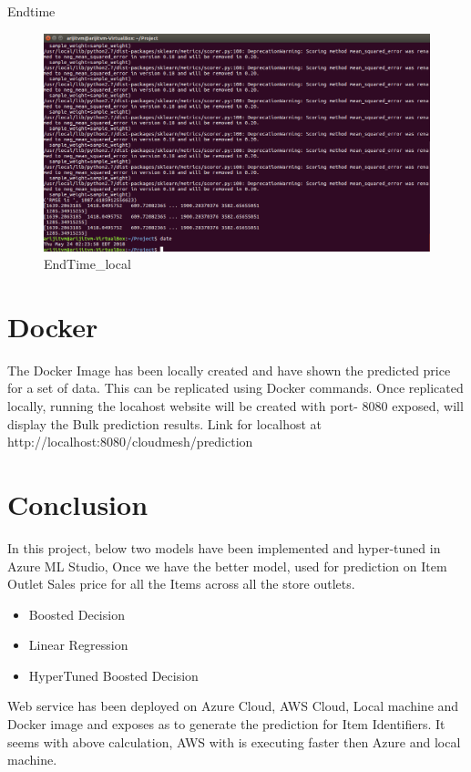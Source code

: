 Endtime 
\begin{figure}[pic12]
	\centering\includegraphics[width=\columnwidth]
{Images/EndTime_local.png}
	\caption{EndTime_local}\label{fig:EndTime_local}
\end{figure}

\section{Docker}

The Docker Image has been locally created and have shown the predicted 
price for a set of data. This can be replicated using Docker commands. 
Once replicated locally, running the locahost website will be created 
with port- 8080 exposed, will display the Bulk prediction results.
Link for localhost at http://localhost:8080/cloudmesh/prediction

\section{Conclusion}

In this project, below two models have been implemented and 
hyper-tuned in Azure ML Studio, Once we have the better model, used for 
prediction on Item Outlet Sales price for all the Items 
across all the store outlets.
\begin{itemize}
\item Boosted Decision
\item Linear Regression
\item HyperTuned Boosted Decision
\end{itemize}
Web service has been deployed on Azure Cloud, AWS Cloud, Local machine 
and Docker image and exposes 
as to generate the prediction for Item Identifiers. It seems with above 
calculation, AWS with is executing faster then Azure and local machine.

